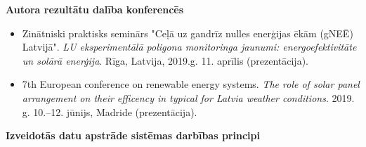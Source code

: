 \textbf{Autora rezultātu dalība konferencēs}
\begin{itemize}
\item Zinātniski praktisks seminārs "Ceļā uz gandrīz nulles enerģijas ēkām (gNEĒ) Latvijā". \emph{LU eksperimentālā poligona monitoringa jaunumi: energoefektivitāte un solārā enerģija}. Rīga, Latvija, 2019.g. 11. aprīlis (prezentācija).
\item 7th European conference on renewable energy systems. \emph{The role of solar panel arrangement on their efficency in typical for Latvia weather conditions}. 2019. g. 10.--12. jūnijs, Madride (prezentācija).
\end{itemize}


\textbf{Izveidotās datu apstrāde sistēmas darbības principi}
